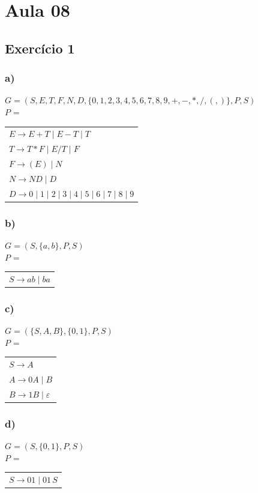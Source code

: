 \section*{Aula 08}
    \subsection*{Exercício 1}
        \subsubsection*{a)}
            $G = ({S,E,T,F,N,D}, \{0,1,2,3,4,5,6,7,8,9,+,-,*,/,(,)\}, P, S)$ \\
            $P$ =
            \begin{tabular}[t]{l}
                $E \rightarrow E + T \mid E - T \mid T$ \\
                $T \rightarrow T * F \mid E / T \mid F$ \\
                $F \rightarrow (E) \mid N$ \\
                $N \rightarrow N D \mid D$ \\
                $D \rightarrow 0 \mid 1 \mid 2 \mid 3 \mid 4 \mid 5 \mid 6 \mid 7 \mid 8 \mid 9$
                \end{tabular}

        \subsubsection*{b)}
            $G = (S, \{a,b\}, P, S)$ \\
            $P$ =
            \begin{tabular}[t]{l}
                \quad $S \rightarrow ab \mid ba$
            \end{tabular}

        \subsubsection*{c)}
            $G = (\{S,A,B\}, \{0,1\}, P, S)$ \\
            $P$ =
            \begin{tabular}[t]{l}
                \quad $S \rightarrow A$ \\
                \quad $A \rightarrow 0A \mid B$ \\
                \quad $B \rightarrow 1B \mid \varepsilon$
            \end{tabular}

        \subsubsection*{d)}
            $G = (S, \{0,1\}, P, S)$ \\
            $P$ =
            \begin{tabular}[t]{l}
                \quad $S \rightarrow 01 \mid 01\,S$
            \end{tabular}

